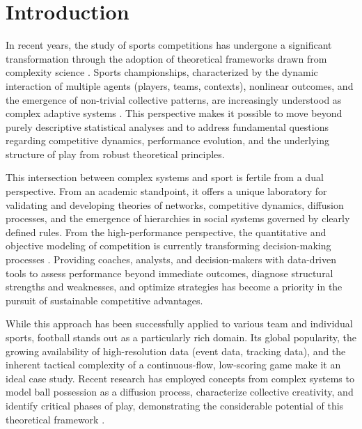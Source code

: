 \documentclass[preprint, amsmath,amssymb, pre]{revtex4-2}
\begin{document}
\maketitle


\section{Introduction}

In recent years, the study of sports competitions has undergone a significant transformation through the adoption of theoretical frameworks drawn from complexity science
\cite{barthelemy2025fragility,Clauset2015safe,buldu2019defining,Ribeiro2012anomalous,Chacoma2022simple,Chacoma2023probabilistic,chacoma2025emergent,zappala2022role,ibanez2018relative,galeano2022using}. 
%
Sports championships, characterized by the dynamic interaction of multiple agents (players, teams, contexts), nonlinear outcomes, and the emergence of non-trivial collective patterns, are increasingly understood as complex adaptive systems \cite{silva2016sports}. This perspective makes it possible to move beyond purely descriptive statistical analyses and to address fundamental questions regarding competitive dynamics, performance evolution, and the underlying structure of play from robust theoretical principles.

This intersection between complex systems and sport is fertile from a dual perspective. From an academic standpoint, it offers a unique laboratory for validating and developing theories of networks, competitive dynamics, diffusion processes, and the emergence of hierarchies in social systems governed by clearly defined rules. From the high-performance perspective, the quantitative and objective modeling of competition is currently transforming decision-making processes \cite{ashford2021understanding}. Providing coaches, analysts, and decision-makers with data-driven tools to assess performance beyond immediate outcomes, diagnose structural strengths and weaknesses, and optimize strategies has become a priority in the pursuit of sustainable competitive advantages.

While this approach has been successfully applied to various team and individual sports, football stands out as a particularly rich domain. 
Its global popularity, the growing availability of high-resolution data (event data, tracking data), and the inherent tactical complexity of a continuous-flow, low-scoring game make it an ideal case study. Recent research has employed concepts from complex systems to model ball possession as a diffusion process, characterize collective creativity, and identify critical phases of play, demonstrating the considerable potential of this theoretical framework \cite{martinez2020spatial,cao2023football,yamamoto2024theory,chacoma2020modeling,chacoma2021stochastic,chacoma2025data,amichay2025characterizing}.
\end{document}
